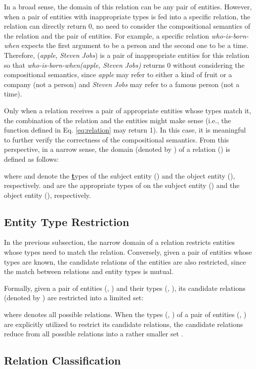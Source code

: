 \documentclass[11pt,a4paper]{article}
\begin{document}
In a broad sense, the domain of this relation can be any pair of entities. 
However, when a pair of entities with inappropriate types is fed into a specific relation, 
the relation can directly return 0, no need to consider the compositional semantics of the relation and the pair of entities.
For example, a specific relation \textit{who-is-born-when} expects the first argument to be a person and the second one to be a time.
Therefore, (\textit{apple}, \textit{Steven Jobs}) is a pair of inappropriate entities for this relation so that 
\textit{who-is-born-when(apple, Steven Jobs)} returns 0 without considering the compositional semantics, 
since \textit{apple} may refer to either a kind of fruit or a company (not a person) and  \textit{Steven Jobs} may refer to a famous person (not a time). 

Only when a relation receives a pair of appropriate entities whose types match it, 
the combination of the relation and the entities might make sense (i.e., the function defined in Eq. \ref{eq:relation} may return 1).
In this case, it is meaningful to further verify the correctness of the  compositional semantics.
From this perspective, in a narrow sense,  the domain (denoted by ) of a relation () is defined as follows:

where   and  denote the \textbf{\underline{t}}ypes of the subject entity () and the object entity (), respectively.
  and  are the appropriate types of  on the subject entity () and the object entity (), respectively.

 
\subsection{Entity Type Restriction}
In the previous subsection, the narrow domain of a relation restricts entities whose types need to match the relation.
Conversely, given a pair of entities whose types are known, the candidate relations of the entities are also restricted, 
since the match between relations and entity types is mutual.

Formally, given a pair of entities  (, ) and their types (, ), 
its candidate relations (denoted by ) are restricted into a limited set:

where  denotes all possible relations. 
When the types (, ) of a pair of entities (, ) are explicitly utilized to restrict its candidate relations, 
the candidate relations reduce from all possible relations   into a rather smaller set .

\subsection{Relation Classification}
\end{document}
